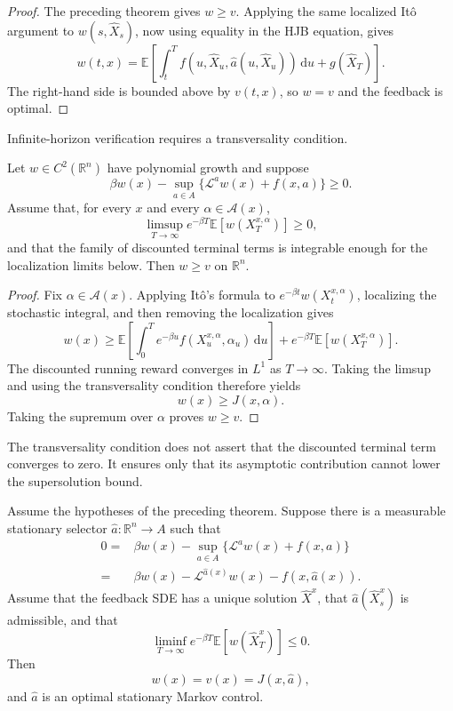 \begin{proof}
The preceding theorem gives \(w\ge v\). Applying the same localized It\^o argument to \(w(s,\hat X_s)\), now using equality in the HJB equation, gives
\[
w(t,x)
=\mathbb E\!\left[
\int_t^T
 f(u,\hat X_u,\hat a(u,\hat X_u))\,\mathrm du
+g(\hat X_T)
\right].
\]
The right-hand side is bounded above by \(v(t,x)\), so \(w=v\) and the feedback is optimal.
\end{proof}

Infinite-horizon verification requires a transversality condition.

\begin{thm}
Let \(w\in C^2(\mathbb R^n)\) have polynomial growth and suppose
\[
\beta w(x)
-\sup_{a\in A}
\{\mathcal L^aw(x)+f(x,a)\}
\ge0.
\]
Assume that, for every \(x\) and every \(\alpha\in\mathcal A(x)\),
\[
\limsup_{T\to\infty}
 e^{-\beta T}\mathbb E[w(X_T^{x,\alpha})]
\ge0,
\]
and that the family of discounted terminal terms is integrable enough for the localization limits below. Then \(w\ge v\) on \(\mathbb R^n\).
\end{thm}

\begin{proof}
Fix \(\alpha\in\mathcal A(x)\). Applying It\^o's formula to \(e^{-\beta t}w(X_t^{x,\alpha})\), localizing the stochastic integral, and then removing the localization gives
\[
w(x)
\ge
\mathbb E\!\left[
\int_0^T e^{-\beta u}
 f(X_u^{x,\alpha},\alpha_u)\,\mathrm du
\right]
+e^{-\beta T}\mathbb E[w(X_T^{x,\alpha})].
\]
The discounted running reward converges in \(L^1\) as \(T\to\infty\). Taking the limsup and using the transversality condition therefore yields
\[
w(x)\ge J(x,\alpha).
\]
Taking the supremum over \(\alpha\) proves \(w\ge v\).
\end{proof}

\begin{remark}
The transversality condition does not assert that the discounted terminal term converges to zero. It ensures only that its asymptotic contribution cannot lower the supersolution bound.
\end{remark}

\begin{thm}
Assume the hypotheses of the preceding theorem. Suppose there is a measurable stationary selector \(\hat a:\mathbb R^n\to A\) such that
\[
\begin{aligned}
0
={}&\beta w(x)
-\sup_{a\in A}\{\mathcal L^aw(x)+f(x,a)\}\\
={}&\beta w(x)
-\mathcal L^{\hat a(x)}w(x)
-f(x,\hat a(x)).
\end{aligned}
\]
Assume that the feedback SDE has a unique solution \(\hat X^x\), that \(\hat a(\hat X_s^x)\) is admissible, and that
\[
\liminf_{T\to\infty}
 e^{-\beta T}\mathbb E[w(\hat X_T^x)]
\le0.
\]
Then
\[
w(x)=v(x)=J(x,\hat a),
\]
and \(\hat a\) is an optimal stationary Markov control.
\end{thm}

